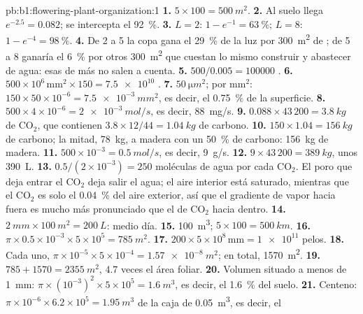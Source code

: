 \begin{solution}{pb:b1:flowering-plant-organization:1}
\textbf{1.} $5\times 100 = \qty{500}{m^2}$.
\textbf{2.} Al suelo llega $e^{-2.5} = 0.082$; se intercepta el
\qty{92}{\%}.
\textbf{3.} $L = 2$: $1 - e^{-1} = \qty{63}{\%}$; $L = 8$: $1 -
e^{-4} = \qty{98}{\%}$.
\textbf{4.} De 2 a 5 la copa gana el \qty{29}{\%} de la luz por
\qty{300}{m^2} de ; de 5 a 8 ganaría el \qty{6}{\%} por otros
\qty{300}{m^2} que cuestan lo mismo construir y abastecer de agua: esas
 de más no salen a cuenta.
\textbf{5.} $500/0.005 = \num{100000}$ .
\textbf{6.} $500\times 10^6\,\mathrm{mm^2}\times 150 = \num{7.5e10}$
.
\textbf{7.} $\qty{50}{\micro m^2}$; por mm$^2$: $150\times 50\times
10^{-6} = \qty{7.5e-3}{mm^2}$, es decir, el \qty{0.75}{\%} de la superficie.
\textbf{8.} $500\times 4\times 10^{-6} = \qty{2e-3}{mol/s}$, es decir,
\qty{88}{mg/s}.
\textbf{9.} $0.088\times 43\,200 = \qty{3.8}{kg}$ de $\mathrm{CO_2}$, que
contienen $3.8\times 12/44 = \qty{1.04}{kg}$ de carbono.
\textbf{10.} $150\times 1.04 = \qty{156}{kg}$ de carbono; la mitad,
\qty{78}{kg}, a madera con un \qty{50}{\%} de carbono: \qty{156}{kg} de
madera.
\textbf{11.} $500\times 10^{-3} = \qty{0.5}{mol/s}$, es decir, \qty{9}{g/s}.
\textbf{12.} $9\times 43\,200 = \qty{389}{kg}$, unos \qty{390}{L}.
\textbf{13.} $0.5/(2\times 10^{-3}) = 250$ moléculas de agua por cada
$\mathrm{CO_2}$. El poro que deja entrar el $\mathrm{CO_2}$ deja salir el
agua; el aire interior está saturado, mientras que el $\mathrm{CO_2}$ es
solo el \qty{0.04}{\%} del aire exterior, así que el gradiente de vapor
hacia fuera es mucho más pronunciado que el de $\mathrm{CO_2}$ hacia
dentro.
\textbf{14.} $\qty{2}{mm}\times\qty{100}{m^2} = \qty{200}{L}$: medio
día.
\textbf{15.} \qty{100}{m^3}; $5\times 100 = \qty{500}{km}$.
\textbf{16.} $\pi\times 0.5\times 10^{-3}\times 5\times 10^5 =
\qty{785}{m^2}$.
\textbf{17.} $200\times 5\times 10^8\,\mathrm{mm} = \num{1e11}$ pelos.
\textbf{18.} Cada uno, $\pi\times 10^{-5}\times 5\times 10^{-4} =
\qty{1.57e-8}{m^2}$; en total, \qty{1570}{m^2}.
\textbf{19.} $785 + 1570 = \qty{2355}{m^2}$, $4.7$ veces el área foliar.
\textbf{20.} Volumen situado a menos de \qty{1}{mm}:
$\pi\times(10^{-3})^2\times 5
\times 10^5 = \qty{1.6}{m^3}$, es decir, el \qty{1.6}{\%} del suelo.
\textbf{21.} Centeno: $\pi\times 10^{-6}\times 6.2\times 10^5 =
\qty{1.95}{m^3}$ de la caja de \qty{0.05}{m^3}, es decir, el

\end{solution}
